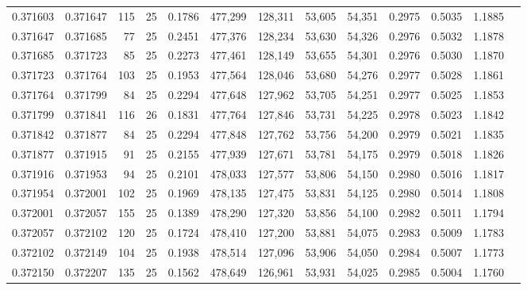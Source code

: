 \begin{tabular}{rrrrrrrrrrrrr}
0.371603 & 0.371647 &   115 &  25 &                                     0.1786 & 477,299 & 128,311 &  53,605 &  54,351 & 0.2975 & 0.5035 & 1.1885 \\
0.371647 & 0.371685 &    77 &  25 &                                     0.2451 & 477,376 & 128,234 &  53,630 &  54,326 & 0.2976 & 0.5032 & 1.1878 \\
0.371685 & 0.371723 &    85 &  25 &                                     0.2273 & 477,461 & 128,149 &  53,655 &  54,301 & 0.2976 & 0.5030 & 1.1870 \\
0.371723 & 0.371764 &   103 &  25 &                                     0.1953 & 477,564 & 128,046 &  53,680 &  54,276 & 0.2977 & 0.5028 & 1.1861 \\
0.371764 & 0.371799 &    84 &  25 &                                     0.2294 & 477,648 & 127,962 &  53,705 &  54,251 & 0.2977 & 0.5025 & 1.1853 \\
0.371799 & 0.371841 &   116 &  26 &                                     0.1831 & 477,764 & 127,846 &  53,731 &  54,225 & 0.2978 & 0.5023 & 1.1842 \\
0.371842 & 0.371877 &    84 &  25 &                                     0.2294 & 477,848 & 127,762 &  53,756 &  54,200 & 0.2979 & 0.5021 & 1.1835 \\
0.371877 & 0.371915 &    91 &  25 &                                     0.2155 & 477,939 & 127,671 &  53,781 &  54,175 & 0.2979 & 0.5018 & 1.1826 \\
0.371916 & 0.371953 &    94 &  25 &                                     0.2101 & 478,033 & 127,577 &  53,806 &  54,150 & 0.2980 & 0.5016 & 1.1817 \\
0.371954 & 0.372001 &   102 &  25 &                                     0.1969 & 478,135 & 127,475 &  53,831 &  54,125 & 0.2980 & 0.5014 & 1.1808 \\
0.372001 & 0.372057 &   155 &  25 &                                     0.1389 & 478,290 & 127,320 &  53,856 &  54,100 & 0.2982 & 0.5011 & 1.1794 \\
0.372057 & 0.372102 &   120 &  25 &                                     0.1724 & 478,410 & 127,200 &  53,881 &  54,075 & 0.2983 & 0.5009 & 1.1783 \\
0.372102 & 0.372149 &   104 &  25 &                                     0.1938 & 478,514 & 127,096 &  53,906 &  54,050 & 0.2984 & 0.5007 & 1.1773 \\
0.372150 & 0.372207 &   135 &  25 &                                     0.1562 & 478,649 & 126,961 &  53,931 &  54,025 & 0.2985 & 0.5004 & 1.1760 \\

\end{tabular}
